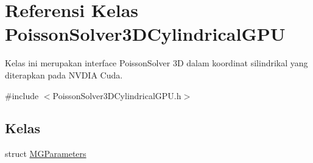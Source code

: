 \hypertarget{classPoissonSolver3DCylindricalGPU}{}\section{Referensi Kelas Poisson\+Solver3\+D\+Cylindrical\+G\+PU}
\label{classPoissonSolver3DCylindricalGPU}


Kelas ini merupakan interface Poisson\+Solver 3D dalam koordinat silindrikal yang diterapkan pada N\+V\+D\+IA Cuda.  




{\ttfamily \#include $<$Poisson\+Solver3\+D\+Cylindrical\+G\+P\+U.\+h$>$}

\subsection*{Kelas}
\begin{DoxyCompactItemize}
\item 
struct \hyperlink{structPoissonSolver3DCylindricalGPU_1_1MGParameters}{M\+G\+Parameters}
\end{DoxyCompactItemize}
